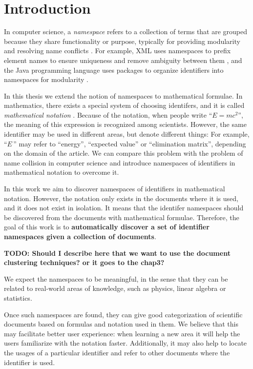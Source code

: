 \section{Introduction}

In computer science, a \emph{namespace} refers to a collection of terms
that are grouped because they share functionality or purpose,
typically for providing modularity and resolving name conflicts \cite{duval2002metadata}.
For example, XML uses namespaces to prefix element names to ensure uniqueness and remove ambiguity between them \cite{xmlnamespaces}, and the Java programming language uses packages to organize identifiers into namespaces for modularity \cite{gosling2014java}.

In this thesis we extend the notion of namespaces to mathematical formulae. 
In mathematics, there exists a special system of choosing identifers, and it is called 
\emph{mathematical notation} \cite{wikinotation}. Because of the notation, 
when people write ``$E=mc^2$'', the meaning of this expression is recognized among scientists. 
However, the same identifier may be used in different areas, but denote 
different things: For example, ``$E$\,'' may refer to ``energy'', ``expected value'' or 
``elimination matrix'', depending on the domain of the article.
We can compare this problem with the problem of name collision in computer science 
and introduce namespaces of identifiers in mathematical notation to overcome it. 

In this work we aim to discover namespaces of identifiers in mathematical notation. 
However, the notation only exists in the documents where it is used, and it does 
not exist in isolation. 
It means that the identifer namespaces should be discovered from the documents 
with mathematical formulae. 
Therefore, the goal of this work is to \textbf{automatically discover a set of identifier
namespaces given a collection of documents}.

\textbf{TODO: Should I describe here that we want to use the document clustering
techniques? or it goes to the chap3?}

We expect the namespaces to be meaningful, in the sense that they can be related to real-world areas of knowledge, such as physics, linear algebra or statistics.

Once such namespaces are found, they can give good categorization of scientific 
documents based on formulas and notation used in them. We believe that this may 
facilitate better user experience: when learning a new area it will help the users 
familiarize with the notation faster.
Additionally, it may also help to locate the usages of a particular identifier and 
refer to other documents where the identifier is used. 

